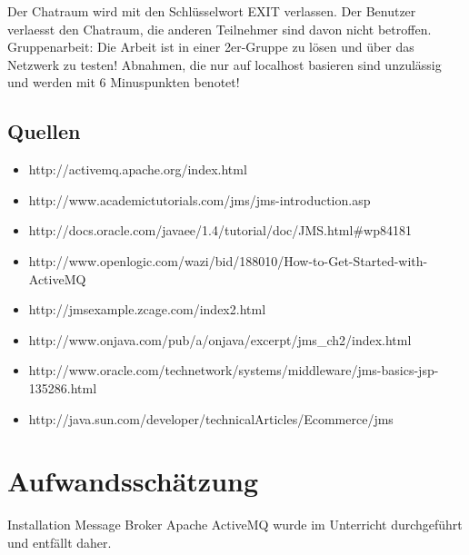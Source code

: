 \documentclass[11pt, a4paper]{article}
\begin{document}
Der Chatraum wird mit den Schlüsselwort EXIT verlassen. Der Benutzer verlaesst den Chatraum, die anderen Teilnehmer sind davon nicht betroffen.
Gruppenarbeit: Die Arbeit ist in einer 2er-Gruppe zu lösen und über das Netzwerk zu testen! Abnahmen, die nur auf localhost basieren sind unzulässig und werden mit 6 Minuspunkten benotet!

\subsection{Quellen}
\begin{itemize}
\item http://activemq.apache.org/index.html
\item http://www.academictutorials.com/jms/jms-introduction.asp
\item http://docs.oracle.com/javaee/1.4/tutorial/doc/JMS.html#wp84181
\item http://www.openlogic.com/wazi/bid/188010/How-to-Get-Started-with-ActiveMQ
\item http://jmsexample.zcage.com/index2.html
\item http://www.onjava.com/pub/a/onjava/excerpt/jms_ch2/index.html
\item http://www.oracle.com/technetwork/systems/middleware/jms-basics-jsp-135286.html
\item http://java.sun.com/developer/technicalArticles/Ecommerce/jms
\end{itemize}

\newpage

\section{Aufwandsschätzung}
Installation Message Broker Apache ActiveMQ wurde im Unterricht durchgeführt und entfällt daher.
\end{document}
